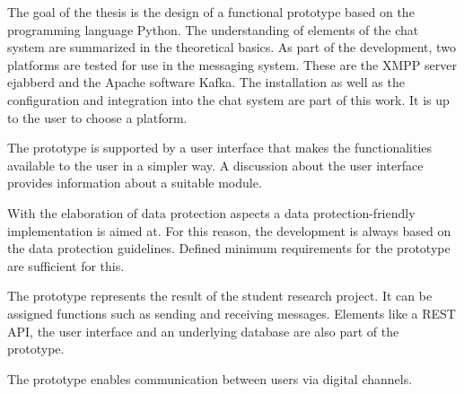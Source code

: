 \documentclass[a4paper,titlepage,halfparskip,12pt]{scrreprt}
\begin{document}
The goal of the thesis is the design of a functional prototype based on the programming language Python. The understanding of elements of the chat system are summarized in the theoretical basics. As part of the development, two platforms are tested for use in the messaging system. These are the XMPP server ejabberd and the Apache software Kafka. The installation as well as the configuration and integration into the chat system are part of this work. It is up to the user to choose a platform.

The prototype is supported by a user interface that makes the functionalities available to the user in a simpler way. A discussion about the user interface provides information about a suitable module.

With the elaboration of data protection aspects a data protection-friendly implementation is aimed at. For this reason, the development is always based on the data protection guidelines. Defined minimum requirements for the prototype are sufficient for this.

The prototype represents the result of the student research project. It can be assigned functions such as sending and receiving messages. Elements like a REST API, the user interface and an underlying database are also part of the prototype.

The prototype enables communication between users via digital channels.


\newpage

	\cleardoublepage
	\begin{spacing}{1.1}
		\begingroup
		
			\renewcommand*{\chapterpagestyle}{empty}
			\pagestyle{empty}
			
			
			\setcounter{tocdepth}{2}
			
			\tableofcontents
			\clearpage
		\endgroup
	\end{spacing}

\renewcommand{\sectionmark}[1]{\markright{\thesection\ #1}} %
\end{document}
